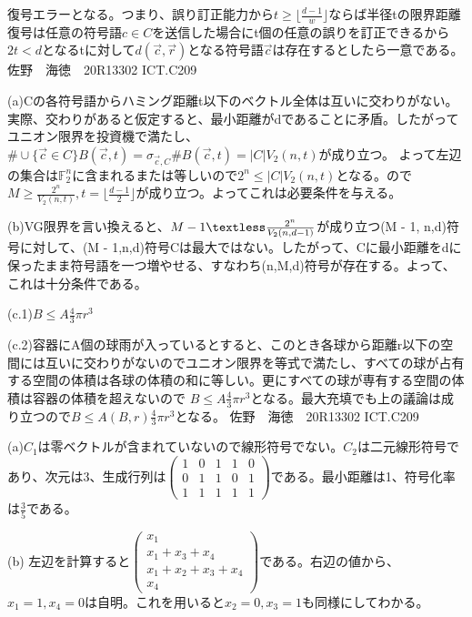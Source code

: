 \documentclass[11pt]{jsarticle}
\begin{document}
復号エラーとなる。つまり、誤り訂正能力から$t \geq \lfloor \frac{d - 1}{w} \rfloor$ならば半径tの限界距離復号は任意の符号語$c \in C$を送信した場合にt個の任意の誤りを訂正できるから
$2t < d$となるtに対して$d(\vec{c},\vec{r})$となる符号語$\vec{c}$は存在するとしたら一意である。
\newpage
佐野　海徳　20R13302 ICT.C209\\
\par(a)Cの各符号語からハミング距離t以下のベクトル全体は互いに交わりがない。実際、交わりがあると仮定すると、最小距離がdであることに矛盾。したがってユニオン限界を投資機で満たし、$\# \cup\{\vec{c} \in C\}B(\vec{c},t) = \sigma_{\vec{c},C}\#B(\vec{c},t) = |C|V_2(n,t)$が成り立つ。
よって左辺の集合は$\mathbb{F}^n_{2}$に含まれるまたは等しいので$2^n \leq |C|V_2(n,t)$となる。ので$M \geq \frac{2^n}{V_2(n,t)},t = \lfloor\frac{d - 1}{2}\rfloor$が成り立つ。よってこれは必要条件を与える。
\par(b)VG限界を言い換えると、$M - 1 \textless \frac{2^n}{V_2(n,d - 1)}$が成り立つ(M - 1, n,d)符号に対して、(M - 1,n,d)符号Cは最大ではない。したがって、Cに最小距離をdに保ったまま符号語を一つ増やせる、すなわち(n,M,d)符号が存在する。よって、これは十分条件である。
\par(c.1)$B \leq A \frac{4}{3}\pi r^3$
\par(c.2)容器にA個の球雨が入っているとすると、このとき各球から距離r以下の空間には互いに交わりがないのでユニオン限界を等式で満たし、すべての球が占有する空間の体積は各球の体積の和に等しい。更にすべての球が専有する空間の体積は容器の体積を超えないので
$B \leq A \frac{4}{3}\pi r^3$となる。最大充填でも上の議論は成り立つので$B \leq A(B,r)\frac{4}{3}\pi r^3$となる。
\newpage
佐野　海徳　20R13302 ICT.C209\\
\par(a)$C_1$は零ベクトルが含まれていないので線形符号でない。$C_2$は二元線形符号であり、次元は3、生成行列は$\left(
\begin{array}{ccccc}
1 & 0 & 1 & 1 & 0 \\
0 & 1 & 1 & 0 & 1 \\
1 & 1 & 1 & 1 & 1
\end{array}
\right)$である。最小距離は1、符号化率は$\frac{3}{5}$である。
\par(b) 左辺を計算すると$\left(
\begin{array}{c}
    x_1 \\
    x_1 + x_3 + x_4 \\
    x_1 + x_2 + x_3 + x_4 \\
    x_4
\end{array}
\right)$である。右辺の値から、$x_1 = 1,x_4 = 0$は自明。これを用いると$x_2 = 0,x_3 = 1$も同様にしてわかる。
\end{document}
